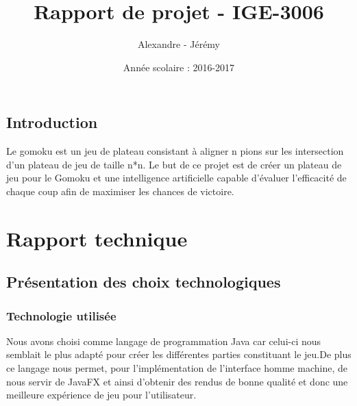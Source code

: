 \documentclass{report}
\title{Rapport de projet - IGE-3006}
\author{Alexandre \bsc{Causse} - Jérémy \bsc{Fornarino}}
\date{Année scolaire : 2016-2017}
\begin{document}
\maketitle

\renewcommand{\contentsname}{Sommaire} 
\tableofcontents
\listoffigures
\newpage

\chapter*{Introduction}
Le gomoku est un jeu de plateau consistant à aligner n pions sur les intersection d'un plateau de jeu de taille n*n.
Le but de ce projet est de créer un plateau de jeu pour le Gomoku et une intelligence artificielle capable d'évaluer l'efficacité de chaque coup afin de maximiser les chances de victoire.


\part{Rapport technique}
	\chapter{Présentation des choix technologiques}
		\section{Technologie utilisée}
Nous avons choisi comme langage de programmation Java car celui-ci nous semblait le plus adapté pour créer les différentes parties constituant le jeu.De plus ce langage nous permet, pour l'implémentation de l'interface homme machine, de nous servir de JavaFX et ainsi d'obtenir des rendus de bonne qualité et donc une meilleure expérience de jeu pour l'utilisateur.
\end{document}
